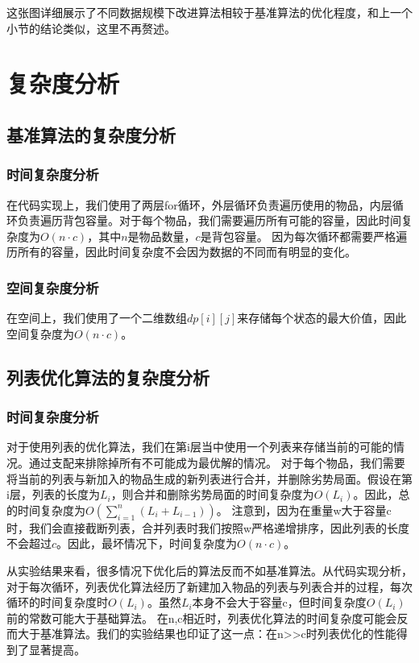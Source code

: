 \documentclass[openany]{book}
\begin{document}
这张图详细展示了不同数据规模下改进算法相较于基准算法的优化程度，和上一个小节的结论类似，这里不再赘述。

\chapter{复杂度分析}
\section{基准算法的复杂度分析}
\subsection{时间复杂度分析}
在代码实现上，我们使用了两层for循环，外层循环负责遍历使用的物品，内层循环负责遍历背包容量。对于每个物品，我们需要遍历所有可能的容量，因此时间复杂度为$O(n \cdot c)$，其中$n$是物品数量，$c$是背包容量。
因为每次循环都需要严格遍历所有的容量，因此时间复杂度不会因为数据的不同而有明显的变化。

\subsection{空间复杂度分析}
在空间上，我们使用了一个二维数组$dp[i][j]$来存储每个状态的最大价值，因此空间复杂度为$O(n \cdot c)$。

\section{列表优化算法的复杂度分析}
\subsection{时间复杂度分析}
对于使用列表的优化算法，我们在第i层当中使用一个列表来存储当前的可能的情况。通过支配来排除掉所有不可能成为最优解的情况。
对于每个物品，我们需要将当前的列表与新加入的物品生成的新列表进行合并，并删除劣势局面。假设在第i层，列表的长度为$L_i$，则合并和删除劣势局面的时间复杂度为$O(L_i)$。因此，总的时间复杂度为$O(\sum_{i=1}^{n} (L_i + L_{i-1}))$。
注意到，因为在重量w大于容量c时，我们会直接截断列表，合并列表时我们按照w严格递增排序，因此列表的长度不会超过$c$。因此，最坏情况下，时间复杂度为$O(n \cdot c)$。

从实验结果来看，很多情况下优化后的算法反而不如基准算法。从代码实现分析，对于每次循环，列表优化算法经历了新建加入物品的列表与列表合并的过程，每次循环的时间复杂度时$O(L_i)$。虽然$L_i$本身不会大于容量c，但时间复杂度$O(L_i)$前的常数可能大于基础算法。
在n,c相近时，列表优化算法的时间复杂度可能会反而大于基准算法。我们的实验结果也印证了这一点：在n>>c时列表优化的性能得到了显著提高。
\end{document}
